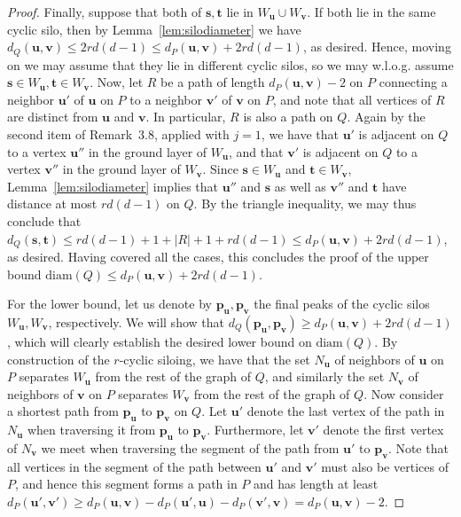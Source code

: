 \documentclass[centering,11pt,reqno]{amsart}
\theoremstyle{definition}
\begin{document}
\begin{proof}
Finally, suppose that both of $\mathbf{s},\mathbf{t}$ lie in $W_\mathbf{u}\cup W_\mathbf{v}$. If both lie in the same cyclic silo, then by Lemma~\ref{lem:silodiameter} we have $d_Q(\mathbf{u},\mathbf{v})\le 2rd(d-1)\le d_P(\mathbf{u},\mathbf{v})+2rd(d-1)$, as desired. Hence, moving on we may assume that they lie in different cyclic silos, so we may w.l.o.g. assume $\mathbf{s}\in W_\mathbf{u}, \mathbf{t}\in W_\mathbf{v}$. Now, let $R$ be a path of length $d_P(\mathbf{u},\mathbf{v})-2$ on $P$ connecting a neighbor $\mathbf{u'}$ of $\mathbf{u}$ on $P$ to a neighbor $\mathbf{v}'$ of $\mathbf{v}$ on $P$, and note that all vertices of $R$ are distinct from $\mathbf{u}$ and $\mathbf{v}$. In particular, $R$ is also a path on $Q$. Again by the second item of Remark~3.8, applied with $j=1$, we have that $\mathbf{u}'$ is adjacent on $Q$ to a vertex $\mathbf{u}''$ in the ground layer of $W_\mathbf{u}$, and that $\mathbf{v}'$ is adjacent on $Q$ to a vertex $\mathbf{v}''$ in the ground layer of $W_\mathbf{v}$. Since $\mathbf{s}\in W_\mathbf{u}$ and $\mathbf{t}\in W_\mathbf{v}$, Lemma~\ref{lem:silodiameter} implies that $\mathbf{u}''$ and $\mathbf{s}$ as well as $\mathbf{v}''$ and $\mathbf{t}$ have distance at most $rd(d-1)$ on $Q$. By the triangle inequality, we may thus conclude that $d_Q(\mathbf{s},\mathbf{t})\le rd(d-1)+1+|R|+1+rd(d-1)\le d_P(\mathbf{u},\mathbf{v})+2rd(d-1)$, as desired. Having covered all the cases, this concludes the proof of the upper bound $\mathrm{diam}(Q)\le d_P(\mathbf{u},\mathbf{v})+2rd(d-1)$.

For the lower bound, let us denote by $\mathbf{p}_\mathbf{u}, \mathbf{p}_\mathbf{v}$ the final peaks of the cyclic silos $W_\mathbf{u}, W_\mathbf{v}$, respectively. We will show that $d_Q(\mathbf{p}_\mathbf{u},\mathbf{p}_\mathbf{v})\ge d_P(\mathbf{u},\mathbf{v})+2rd(d-1)$, which will clearly establish the desired lower bound on $\mathrm{diam}(Q)$. By construction of the $r$-cyclic siloing, we have that the set $N_\mathbf{u}$ of neighbors of $\mathbf{u}$ on $P$ separates $W_\mathbf{u}$ from the rest of the graph of $Q$, and similarly the set $N_\mathbf{v}$ of neighbors of $\mathbf{v}$ on $P$ separates $W_\mathbf{v}$ from the rest of the graph of $Q$. Now consider a shortest path from $\mathbf{p}_\mathbf{u}$ to $\mathbf{p}_\mathbf{v}$ on $Q$. Let $\mathbf{u'}$ denote the last vertex of the path in $N_\mathbf{u}$ when traversing it from $\mathbf{p}_\mathbf{u}$ to $\mathbf{p}_\mathbf{v}$. Furthermore, let $\mathbf{v}'$ denote the first vertex of $N_\mathbf{v}$ we meet when traversing the segment of the path from $\mathbf{u}'$ to $\mathbf{p}_\mathbf{v}$. Note that all vertices in the segment of the path between $\mathbf{u}'$ and $\mathbf{v}'$ must also be vertices of $P$, and hence this segment forms a path in $P$ and has length at least $d_P(\mathbf{u}',\mathbf{v}')\ge d_P(\mathbf{u},\mathbf{v})-d_P(\mathbf{u}',\mathbf{u})-d_P(\mathbf{v}',\mathbf{v})=d_P(\mathbf{u},\mathbf{v})-2$.


\end{proof}
\end{document}
